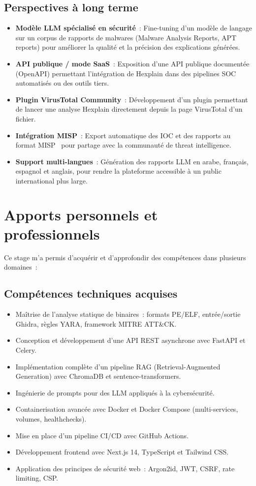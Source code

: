 \subsection{Perspectives à long terme}

\begin{itemize}
  \item \textbf{Modèle LLM spécialisé en sécurité}~: Fine-tuning d'un modèle de langage sur un corpus de rapports de malwares (Malware Analysis Reports, APT reports) pour améliorer la qualité et la précision des explications générées.
  \item \textbf{API publique / mode SaaS}~: Exposition d'une API publique documentée (OpenAPI) permettant l'intégration de Hexplain dans des pipelines SOC automatisés ou des outils tiers.
  \item \textbf{Plugin VirusTotal Community}~: Développement d'un plugin permettant de lancer une analyse Hexplain directement depuis la page VirusTotal d'un fichier.
  \item \textbf{Intégration MISP}~: Export automatique des IOC et des rapports au format MISP~\cite{misp2016} pour partage avec la communauté de threat intelligence.
  \item \textbf{Support multi-langues}~: Génération des rapports LLM en arabe, français, espagnol et anglais, pour rendre la plateforme accessible à un public international plus large.
\end{itemize}

\section{Apports personnels et professionnels}

Ce stage m'a permis d'acquérir et d'approfondir des compétences dans plusieurs domaines~:

\subsection{Compétences techniques acquises}
\begin{itemize}
  \item Maîtrise de l'analyse statique de binaires~: formats PE/ELF, entrée/sortie Ghidra, règles YARA, framework MITRE ATT\&CK.
  \item Conception et développement d'une API REST asynchrone avec FastAPI et Celery.
  \item Implémentation complète d'un pipeline RAG (Retrieval-Augmented Generation) avec ChromaDB et sentence-transformers.
  \item Ingénierie de prompts pour des LLM appliqués à la cybersécurité.
  \item Containerisation avancée avec Docker et Docker Compose (multi-services, volumes, healthchecks).
  \item Mise en place d'un pipeline CI/CD avec GitHub Actions.
  \item Développement frontend avec Next.js 14, TypeScript et Tailwind CSS.
  \item Application des principes de sécurité web~: Argon2id, JWT, CSRF, rate limiting, CSP.
\end{itemize}

